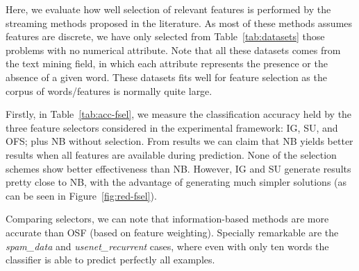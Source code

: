 \documentclass[preprint,12pt]{elsarticle}
\begin{document}
Here, we evaluate how well selection of relevant features is performed by the streaming methods proposed in the literature. As most of these methods assumes features are discrete, we have only selected from Table~\ref{tab:datasets} those problems with no numerical attribute. Note that all these datasets comes from the text mining field, in which each attribute represents the presence or the absence of a given word. These datasets fits well for feature selection as the corpus of words/features is normally quite large.

Firstly, in Table~\ref{tab:acc-fsel}, we measure the classification accuracy held by the three feature selectors considered in the experimental framework: IG, SU, and OFS; plus NB without selection. From results we can claim that NB yields better results when all features are available during prediction. None of the selection schemes show better effectiveness than NB. However, IG and SU generate results pretty close to NB, with the advantage of generating much simpler solutions (as can be seen in Figure~\ref{fig:red-fsel}). 

Comparing selectors, we can note that information-based methods are more accurate than OSF (based on feature weighting). Specially remarkable are the \textit{spam\_data} and \textit{usenet\_recurrent} cases, where even with only ten words the classifier is able to predict perfectly all examples. 
\end{document}
